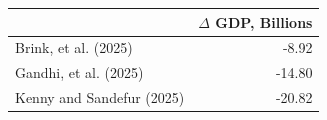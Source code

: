 \begin{tabular}{lr}
\toprule
 & $\Delta$ GDP, Billions \\
\midrule
Brink, et al. (2025) & -8.92 \\
Gandhi, et al. (2025) & -14.80 \\
Kenny and Sandefur (2025) & -20.82 \\
\bottomrule
\end{tabular}
